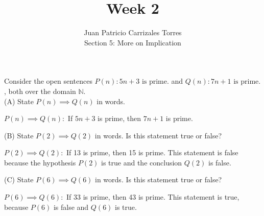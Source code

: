 \documentclass[12pt]{article}
\newenvironment{problem}[2][Problem]{\begin{trivlist}
		\item[\hskip \labelsep {\bfseries #1}\hskip \labelsep {\bfseries #2.}]}{\end{trivlist}}
\newenvironment{solution}[2][Solution]{\begin{trivlist}
		\item[\hskip \labelsep {\bfseries #1}\hskip \labelsep {\bfseries #2.}]}{\end{trivlist}}
\begin{document}
	
\title{Week 2}
\author{Juan Patricio Carrizales Torres \\
Section 5: More on Implication}

\maketitle

\begin{problem}{30}
	Consider the open sentences $P(n): 5n + 3 \text{ is prime.}$ and $Q(n): 7n + 1 \text{ is prime.}$, both over the domain $\mathbb{N}$.\\
	
	(A) State $P(n) \implies Q(n)$ in words.
\begin{solution}{a}
	$P(n) \implies Q(n):$ If $5n +3$ is prime, then $7n + 1$ is prime.
\end{solution}

	(B) State $P(2) \implies Q(2)$ in words. Is this statement true or false?
\begin{solution}{b}
	$P(2) \implies Q(2):$ If 13 is prime, then 15 is prime. This statement is false because the hypothesis $P(2)$ is true and the conclusion $Q(2)$ is false.
\end{solution}

	(C) State $P(6) \implies Q(6)$ in words. Is this statement true or false?
\begin{solution}{c}
	$P(6) \implies Q(6):$ If 33 is prime, then 43 is prime. This statement is true, because $P(6)$ is false and $Q(6)$ is true.
\end{solution}
\end{problem}
\end{document}
